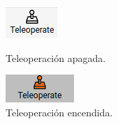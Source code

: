 \documentclass[a4paper, 12pt]{book}
\begin{document}
\begin{figure}[H]
  \centering
  \begin{minipage}[b]{0.4\textwidth}
    \includegraphics[width=\textwidth,height=\textwidth]{img/teleoperate_off.png}
    \caption{Teleoperación apagada.}
    \label{figura:stun}
  \end{minipage}
  \hfill
  \begin{minipage}[b]{0.4\textwidth}
    \includegraphics[width=\textwidth,height=\textwidth]{img/teleoperate_on.png}
    \caption{Teleoperación encendida.}
    \label{figura:turn}
  \end{minipage}
\end{figure}
\end{document}
